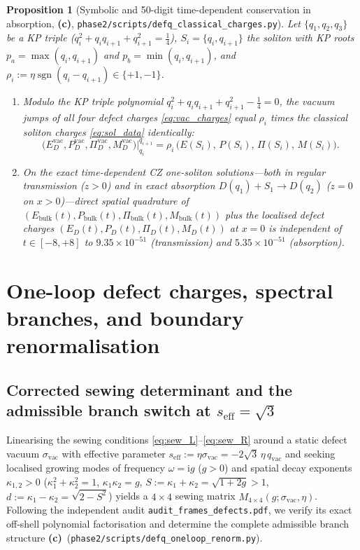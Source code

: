 \documentclass[11pt,a4paper]{article}
\newcommand{\Lc}{\textsf{\textbf{(c)}}}
\newcommand{\ii}{\mathrm{i}}
\newcommand{\sgn}{\operatorname{sgn}}
\newcommand{\sclass}{\texttt{phase2/\allowbreak scripts/\allowbreak defq\_\allowbreak classical\_\allowbreak charges.py}}
\newcommand{\sren}{\texttt{phase2/\allowbreak scripts/\allowbreak defq\_\allowbreak oneloop\_\allowbreak renorm.py}}
\newtheorem{proposition}{Proposition}[section]
\theoremstyle{remark}
\begin{document}
\begin{proposition}[Symbolic and 50-digit time-dependent conservation in absorption, \Lc, \sclass]\label{prop:classical_absorption}
Let $\{q_1,q_2,q_3\}$ be a KP triple ($q_i^2 + q_i q_{i+1} + q_{i+1}^2 = \frac{1}{4}$),
$S_i = \{q_i,q_{i+1}\}$ the soliton with KP roots $p_a = \max(q_i,q_{i+1})$ and
$p_b = \min(q_i,q_{i+1})$, and $\rho_i := \eta\sgn(q_i - q_{i+1}) \in \{+1,-1\}$.
\begin{enumerate}
\item Modulo the KP triple polynomial $q_i^2 + q_i q_{i+1} + q_{i+1}^2 - \frac{1}{4} = 0$,
the vacuum jumps of all four defect charges \eqref{eq:vac_charges} equal $\rho_i$
times the classical soliton charges \eqref{eq:sol_data} identically:
\begin{equation}\label{eq:vac_jump_all4}
  \boxed{\;
  \big(E_D^{\mathrm{vac}},P_D^{\mathrm{vac}},\Pi_D^{\mathrm{vac}},M_D^{\mathrm{vac}}\big)\big|_{q_i}^{q_{i+1}}
  = \rho_i\,\big(E(S_i),\,P(S_i),\,\Pi(S_i),\,M(S_i)\big).
  \;}
\end{equation}
\item On the exact time-dependent CZ one-soliton solutions---both in regular
transmission ($z>0$) and in exact absorption $D(q_1)+S_1 \to D(q_2)$ ($z=0$ on
$x>0$)---direct spatial quadrature of $(E_{\mathrm{bulk}}(t),P_{\mathrm{bulk}}(t),\Pi_{\mathrm{bulk}}(t),M_{\mathrm{bulk}}(t))$
plus the localised defect charges $(E_D(t),P_D(t),\Pi_D(t),M_D(t))$ at $x=0$ is
independent of $t \in [-8,+8]$ to $9.35\times 10^{-51}$ (transmission) and
$5.35\times 10^{-51}$ (absorption).
\end{enumerate}
\end{proposition}

\section{One-loop defect charges, spectral branches, and boundary renormalisation}
\label{sec:oneloop}

\subsection{Corrected sewing determinant and the admissible branch switch at \texorpdfstring{$s_{\mathrm{eff}} = \sqrt{3}$}{s\_eff = sqrt(3)}}

Linearising the sewing conditions \eqref{eq:sew_L}--\eqref{eq:sew_R} around a
static defect vacuum $\sigma_{\mathrm{vac}}$ with effective parameter
$s_{\mathrm{eff}} := \eta\sigma_{\mathrm{vac}} = -2\sqrt{3}\,\eta\,q_{\mathrm{vac}}$
and seeking localised growing modes of frequency $\omega = \ii g$ ($g>0$) and
spatial decay exponents $\kappa_{1,2} > 0$ ($\kappa_1^2+\kappa_2^2=1$,
$\kappa_1\kappa_2=g$, $S := \kappa_1+\kappa_2 = \sqrt{1+2g} > 1$,
$d := \kappa_1-\kappa_2 = \sqrt{2-S^2}$) yields a $4\times 4$ sewing matrix
$M_{4\times 4}(g;\sigma_{\mathrm{vac}},\eta)$. Following the independent audit
\texttt{audit\_frames\_defects.pdf}, we verify its exact off-shell polynomial
factorisation and determine the complete admissible branch structure \Lc\
(\sren).
\end{document}

